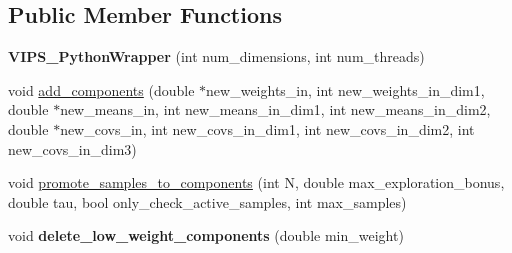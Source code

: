 \subsection*{Public Member Functions}
\begin{DoxyCompactItemize}
\item 
{\bfseries V\+I\+P\+S\+\_\+\+Python\+Wrapper} (int num\+\_\+dimensions, int num\+\_\+threads)\hypertarget{classVIPS__PythonWrapper_a4e4c340a7b224932307954327bd2cb1f}{}\label{classVIPS__PythonWrapper_a4e4c340a7b224932307954327bd2cb1f}

\item 
void \hyperlink{classVIPS__PythonWrapper_a0a51f6e59a9b843e4a21262e4c119bbd}{add\+\_\+components} (double $\ast$new\+\_\+weights\+\_\+in, int new\+\_\+weights\+\_\+in\+\_\+dim1, double $\ast$new\+\_\+means\+\_\+in, int new\+\_\+means\+\_\+in\+\_\+dim1, int new\+\_\+means\+\_\+in\+\_\+dim2, double $\ast$new\+\_\+covs\+\_\+in, int new\+\_\+covs\+\_\+in\+\_\+dim1, int new\+\_\+covs\+\_\+in\+\_\+dim2, int new\+\_\+covs\+\_\+in\+\_\+dim3)
\item 
void \hyperlink{classVIPS__PythonWrapper_a66e3c05b6e653180186dfe64cbb0cbc8}{promote\+\_\+samples\+\_\+to\+\_\+components} (int N, double max\+\_\+exploration\+\_\+bonus, double tau, bool only\+\_\+check\+\_\+active\+\_\+samples, int max\+\_\+samples)
\item 
void {\bfseries delete\+\_\+low\+\_\+weight\+\_\+components} (double min\+\_\+weight)\hypertarget{classVIPS__PythonWrapper_afbf65f23a6bea8ba1571813c8916f8f3}{}\label{classVIPS__PythonWrapper_afbf65f23a6bea8ba1571813c8916f8f3}


\end{DoxyCompactItemize}
